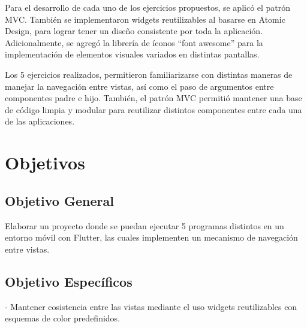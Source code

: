 \documentclass[12pt,letterpaper]{article}
\begin{document}
Para el desarrollo de cada uno de los ejercicios propuestos, se aplicó el patrón MVC. También se implementaron widgets reutilizables al basarse en Atomic Design, para lograr tener un diseño consistente por toda la aplicación. Adicionalmente, se agregó la librería de íconos “font awesome” para la implementación de elementos visuales variados en distintas pantallas. 

Los 5 ejercicios realizados, permitieron familiarizarse con distintas maneras de manejar la navegación entre vistas, así como el paso de argumentos entre componentes padre e hijo. También, el patrón MVC permitió mantener una base de código limpia y modular para reutilizar distintos componentes entre cada una de las aplicaciones.

\newpage


\renewcommand{\contentsname}{Índice de Contenidos}
{\setlength{\parskip}{0pt}
\tableofcontents
}

\vspace{1.0cm}

\renewcommand{\listfigurename}{Índice de Ilustraciones}
{\setlength{\cftbeforefigskip}{2pt}
\listoffigures
}

\newpage


\section{Objetivos}
\subsection{Objetivo General}
Elaborar un proyecto donde se puedan ejecutar 5 programas distintos en un entorno móvil con Flutter, las cuales implementen un mecanismo de navegación entre vistas.

\subsection{Objetivo Específicos}
- Mantener cosistencia entre las vistas mediante el uso widgets reutilizables con esquemas de color predefinidos.
\end{document}
